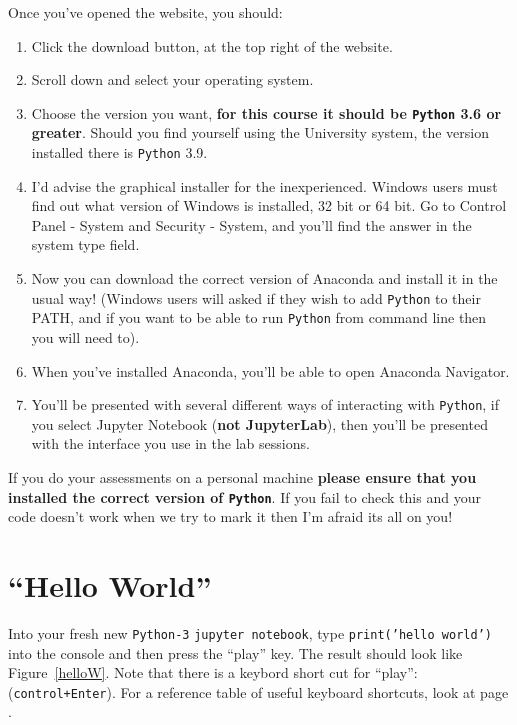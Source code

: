 Once you've opened the website, you should:
\begin{enumerate}
    \item Click the download button, at the top right of the website.
    \item Scroll down and select your operating system.
    \item Choose the version you want, \textbf{for this course it should be \texttt{Python} 3.6 or greater}. Should you find yourself using the University system, the version installed there is \texttt{Python} 3.9.
    \item I'd advise the graphical installer for the inexperienced. Windows users must find out what version of Windows is installed, 32 bit or 64 bit. Go to Control Panel - System and Security - System, and you'll find the answer in the system type field.
    \item Now you can download the correct version of Anaconda and install it in the usual way! (Windows users will asked if they wish to add \texttt{Python} to their PATH, and if you want to be able to run \texttt{Python} from command line then you will need to).
    \item When you've installed Anaconda, you'll be able to open Anaconda Navigator.
    \item You'll be presented with several different ways of interacting with \texttt{Python}, if you select Jupyter Notebook (\textbf{not JupyterLab}), then you'll be presented with the interface you use in the lab sessions.
\end{enumerate}

If you do your assessments on a personal machine \textbf{please ensure that you installed the correct version of \texttt{Python}}. If you fail to check this and your code doesn't work when we try to mark it then I'm afraid its all on you!


\section{``Hello World''}
\label{HelloWorld}

Into your fresh new \texttt{Python-3} \texttt{jupyter notebook}, type {\tt print('hello world')} into the console and then press the ``play'' key. The result should look like Figure~\ref{helloW}. Note that there is a keybord short cut for ``play'': \keys{\ctrl+\enter} ({\tt control+Enter}). For a reference table of useful keyboard shortcuts, look at page \pageref{JupKeyShort}.

